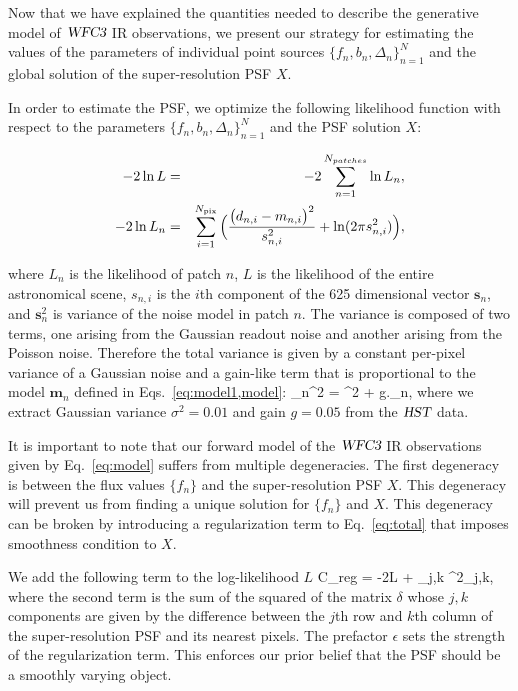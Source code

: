 Now that we have explained the quantities needed to describe the generative model of ${\textsl{WFC3}}$ IR observations, we 
present our strategy for estimating the values of the parameters of individual point sources $\{f_{n},b_{n},\Delta_{n}\}_{n=1}^{N}$ and 
the global solution of the super-resolution PSF $X$.


In order to estimate the PSF, we optimize the following likelihood function with respect to the parameters $\{f_{n},b_{n},\Delta_{n}\}_{n=1}^{N}$ and the PSF solution $X$:

\begin{eqnarray} -2 \ln L &=& -2 \sum_{n=1}^{N_{patches}} \ln L_{n} \label{eq:total} , \\
-2 \ln L_{n} &=& \sum_{i=1}^{N_{\rm pix}} \Big( \frac{\big(d_{n,i} - m_{n,i} \big)^{2}}{s^{2}_{n,i}} + \ln(2 \pi s_{n,i}^{2}) \Big) \label{eq:patch},
\end{eqnarray}

where $L_{n}$ is the likelihood of patch $n$, $L$ is the likelihood of the entire astronomical scene, $s_{n,i}$ is the $i$th component of the 625 dimensional vector $\mathbf{s}_n$, and 
$\mathbf{s}_n^{2}$ is variance of the noise model in patch $n$. The variance is composed of two terms, one arising from the Gaussian readout noise and another arising from the Poisson noise.
Therefore the total variance is given by a constant per-pixel variance of a Gaussian noise and a gain-like term that is proportional to the model $\mathbf{m}_{n}$ defined in Eqs.~\ref{eq:model1,model}:
\beq
{}_n^{2} = \sigma^{2} + g._{n},
\label{eq:variance}
\eeq
where we extract Gaussian variance $\sigma^{2}=0.01$ and gain $g=0.05$ from the ${\textsl{HST}}$ data. 

It is important to note that our forward model of the ${\textsl{WFC3}}$ IR 
observations given by Eq.~\ref{eq:model} suffers from multiple degeneracies. The first degeneracy is between 
the flux values $\{f_n\}$ and the super-resolution PSF $X$. This degeneracy will prevent us from finding a unique 
solution for $\{f_n\}$ and $X$. This degeneracy can be broken by introducing a regularization term to Eq.~\ref{eq:total} that imposes 
smoothness condition to $X$. 

We add the following term to the log-likelihood $L$
\beq
C_{\rm reg} = -2\ln L + \epsilon \sum_{j,k} \delta^{2}_{j,k},
\label{eq:reg}
\eeq
where the second term is the sum of the squared of the matrix $\delta$ whose $j,k$ components are given by the difference between the $j$th row and $k$th column of the super-resolution PSF 
and its nearest pixels. The prefactor $\epsilon$ sets the strength of the regularization term. This enforces our prior belief that the PSF should be a smoothly varying object.

